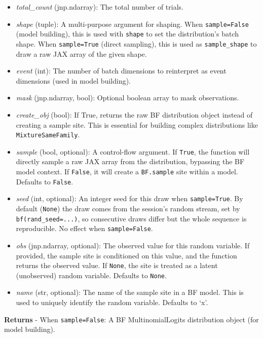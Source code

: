 \documentclass[
  letterpaper,
  DIV=11,
  numbers=noendperiod]{scrartcl}
\begin{document}
\begin{itemize}
\item
  \emph{total\_count} (jnp.ndarray): The total number of trials.
\item
  \emph{shape} (tuple): A multi-purpose argument for shaping. When
  \texttt{sample=False} (model building), this is used with
  \texttt{shape} to set the distribution's batch shape. When
  \texttt{sample=True} (direct sampling), this is used as
  \texttt{sample\_shape} to draw a raw JAX array of the given shape.
\item
  \emph{event} (int): The number of batch dimensions to reinterpret as
  event dimensions (used in model building).
\item
  \emph{mask} (jnp.ndarray, bool): Optional boolean array to mask
  observations.
\item
  \emph{create\_obj} (bool): If True, returns the raw BF distribution
  object instead of creating a sample site. This is essential for
  building complex distributions like \texttt{MixtureSameFamily}.
\item
  \emph{sample} (bool, optional): A control-flow argument. If
  \texttt{True}, the function will directly sample a raw JAX array from
  the distribution, bypassing the BF model context. If \texttt{False},
  it will create a \texttt{BF.sample} site within a model. Defaults to
  \texttt{False}.
\item
  \emph{seed} (int, optional): An integer seed for this draw when
  \texttt{sample=True}. By default (\texttt{None}) the draw comes from
  the session's random stream, set by \texttt{bf(rand\_seed=...)}, so
  consecutive draws differ but the whole sequence is reproducible. No
  effect when \texttt{sample=False}.
\item
  \emph{obs} (jnp.ndarray, optional): The observed value for this random
  variable. If provided, the sample site is conditioned on this value,
  and the function returns the observed value. If \texttt{None}, the
  site is treated as a latent (unobserved) random variable. Defaults to
  \texttt{None}.
\item
  \emph{name} (str, optional): The name of the sample site in a BF
  model. This is used to uniquely identify the random variable. Defaults
  to `x'.
\end{itemize}

\textbf{Returns} - When \texttt{sample=False}: A BF MultinomialLogits
distribution object (for model building).
\end{document}
